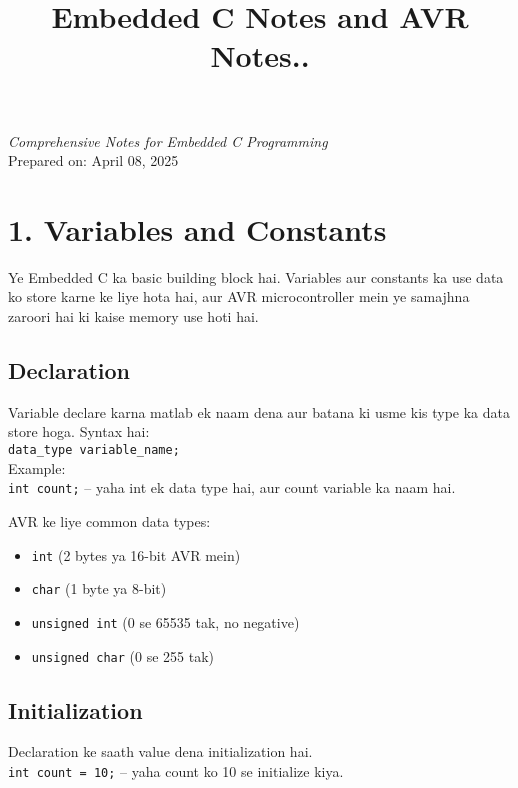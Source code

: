 \documentclass[a4paper,12pt]{article}
\title{\textbf{\Huge \textcolor{warningred}{Embedded C Notes and AVR Notes..}}}
\author{}
\date{}
\begin{document}
\maketitle
\begin{center}
    \Large{\textit{Comprehensive Notes for Embedded C Programming}} \\
    \vspace{0.5cm}
    \normalsize{Prepared on: April 08, 2025}
\end{center}
\newpage

\section*{\textbf{\LARGE \textcolor{headingblue}{1. Variables and Constants}}}
Ye Embedded C ka basic building block hai. Variables aur constants ka use data ko store karne ke liye hota hai, aur AVR microcontroller mein ye samajhna zaroori hai ki kaise memory use hoti hai.

\subsection*{Declaration}
Variable declare karna matlab ek naam dena aur batana ki usme kis type ka data store hoga. Syntax hai: \\
\texttt{data\_type variable\_name;} \\
Example: \\
\texttt{int count;} – yaha int ek data type hai, aur count variable ka naam hai.

AVR ke liye common data types: \\
\begin{itemize}
    \item \texttt{int} (2 bytes ya 16-bit AVR mein)
    \item \texttt{char} (1 byte ya 8-bit)
    \item \texttt{unsigned int} (0 se 65535 tak, no negative)
    \item \texttt{unsigned char} (0 se 255 tak)
\end{itemize}

\subsection*{Initialization}
Declaration ke saath value dena initialization hai. \\
\texttt{int count = 10;} – yaha count ko 10 se initialize kiya.
\end{document}
